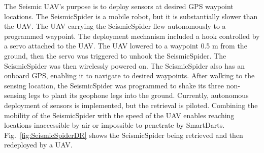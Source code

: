 The Seismic UAV's purpose is to deploy sensors at desired GPS waypoint locations. The SeismicSpider is a mobile robot, but it is substantially slower than the UAV.  The UAV carrying the SeismicSpider flew autonomously to a programmed waypoint. The deployment mechanism included a hook controlled by a servo attached to the UAV. The UAV lowered to a waypoint 0.5 m from the ground, then the servo was triggered to unhook the SeismicSpider.  The SeismicSpider was then wirelessly powered on. 
The SeismicSpider also has an onboard GPS, enabling it to navigate to desired waypoints. 
After walking to the sensing location, the SeismicSpider was programmed to shake its three non-sensing legs to plant its geophone legs into the ground.  
  Currently, autonomous deployment of sensors is implemented, but the retrieval is piloted. 
Combining the mobility of the SeismicSpider with the speed of the UAV enables reaching locations inaccessible by air or impossible to penetrate by SmartDarts.
Fig.~\ref{fig:SeismicSpiderDR} shows the SeismicSpider being retrieved and then redeployed by a UAV.





